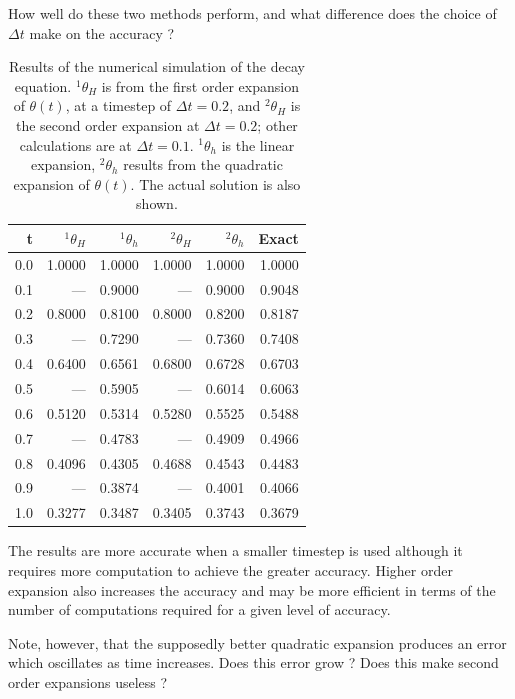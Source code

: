 \documentclass[10pt]{article}
\begin{document}
	How well do these two methods perform, and what difference does the 
	choice of $\Delta t$ make on the accuracy ?
	
		\begin{table}[h]
		\begin{center}
			\begin{tabular} {r | r r rr r}
				t	& $^1\theta_H$ & $^1\theta_h$ & $^2\theta_H$ & $^2\theta_h$ & Exact \\ \hline
				0.0   &	1.0000  	& 1.0000	& 1.0000 	& 1.0000 	& 1.0000 \\
				0.1	&	---			&	0.9000	& ---			& 0.9000 	& 0.9048 \\
				0.2	& 0.8000	& 0.8100	& 0.8000	& 0.8200 	& 0.8187 \\
				0.3 	& ---     		& 0.7290	& ---			&	0.7360	&	0.7408 \\
				0.4	& 	0.6400	& 0.6561	& 0.6800	& 0.6728	& 0.6703 \\
				0.5	& ---			& 0.5905	& ---			& 0.6014	& 0.6063 \\
				0.6	& 0.5120	& 0.5314	& 0.5280	& 0.5525	& 0.5488 \\
				0.7	& ---			& 0.4783	& ---			& 0.4909	& 0.4966 \\
				0.8	& 0.4096	& 0.4305	& 0.4688	& 0.4543	& 0.4483 \\
				0.9	& ---			& 0.3874	& ---			& 0.4001	& 0.4066 \\
				1.0	& 0.3277	& 0.3487	& 0.3405	& 0.3743	& 0.3679
			\end{tabular}	
		\end{center}	
		\caption[]{Results of the numerical simulation of the decay equation. $^1\theta_H$ is from the
		 first order expansion of $\theta(t)$, at a timestep of $\Delta t=0.2$, and $^2\theta_H$ is
		 the second order expansion at $\Delta t=0.2$; other calculations are at $\Delta t = 0.1$. 
		$^1\theta_h$ is the linear expansion,  $^2\theta_h$ results from the quadratic expansion
		of $\theta(t)$. The actual solution is also shown.}
		\end{table}
	  
	The results are more accurate when a smaller timestep is used although it
	requires more computation to achieve the greater accuracy. Higher order expansion
	also increases the accuracy and may be more efficient in terms of the number of computations
	required for a given level of accuracy.
	
	Note, however, that the supposedly better quadratic expansion produces an error which
	oscillates as time increases. Does this error grow ? Does this make second order
	expansions useless ?
	
\end{document}
